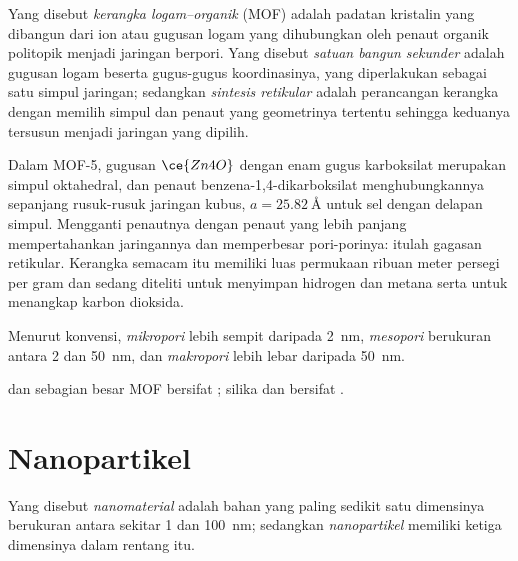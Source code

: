 \begin{definition}\label{def:b3:inorganic-materials:mof}
Yang disebut \emph{kerangka logam--organik} (MOF) adalah
padatan kristalin yang dibangun dari ion atau gugusan logam yang dihubungkan oleh penaut
organik politopik menjadi jaringan berpori. Yang disebut \emph{satuan bangun
sekunder} adalah gugusan logam beserta gugus-gugus
koordinasinya, yang diperlakukan sebagai satu simpul jaringan; sedangkan \emph{sintesis
retikular} adalah perancangan kerangka dengan memilih
simpul dan penaut yang geometrinya tertentu sehingga keduanya tersusun menjadi jaringan yang dipilih.
\end{definition}

Dalam MOF-5, gugusan $\ce{Zn4O}$ dengan enam gugus karboksilat merupakan simpul oktahedral,
dan penaut benzena-1,4-dikarboksilat menghubungkannya sepanjang rusuk-rusuk jaringan
kubus, $a = \qty{25.82}{\angstrom}$ untuk sel dengan delapan simpul. Mengganti penautnya dengan penaut yang lebih
panjang mempertahankan jaringannya dan memperbesar pori-porinya: itulah gagasan retikular. Kerangka
semacam itu memiliki luas permukaan ribuan meter persegi per gram dan sedang
diteliti untuk menyimpan hidrogen dan metana serta untuk menangkap karbon dioksida.

\begin{definition}\label{def:b3:inorganic-materials:pores}
Menurut konvensi, \emph{mikropori} lebih sempit daripada \qty{2}{nm},
\emph{mesopori} berukuran antara 2 dan \qty{50}{nm}, dan
\emph{makropori} lebih lebar daripada \qty{50}{nm}.
\end{definition}

 dan sebagian besar MOF bersifat ;  silika dan  bersifat .

\section{Nanopartikel}

\begin{definition}[Nanomaterial]\label{def:b3:inorganic-materials:nano}
Yang disebut \emph{nanomaterial} adalah bahan yang paling sedikit satu dimensinya berukuran antara
sekitar 1 dan \qty{100}{nm}; sedangkan \emph{nanopartikel} memiliki ketiga
dimensinya dalam rentang itu.
\end{definition}

